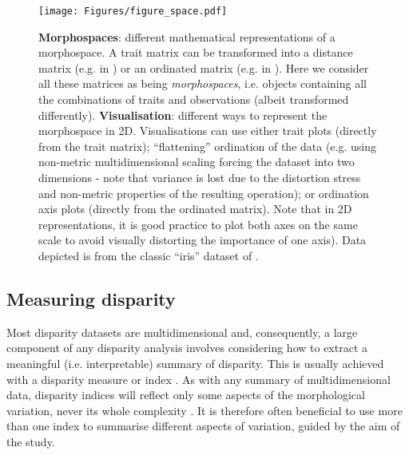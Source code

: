 \documentclass[12pt,letterpaper]{article}
\begin{document}
\begin{figure}[!htbp]
\centering
   \texttt{[image: Figures/figure\_space.pdf]}
\caption{
    \tiny{
    \textbf{Morphospaces}: different mathematical representations of a morphospace. A trait matrix can be transformed into a distance matrix (e.g. in \citealt{Close2015}) or an ordinated matrix (e.g. in \citealt{tyler2011detecting}).
    Here we consider all these matrices as being \textit{morphospaces}, i.e. objects containing all the combinations of traits and observations (albeit transformed differently).
    \textbf{Visualisation}: different  ways to represent the morphospace in 2D.
    Visualisations can use either trait plots (directly from the trait matrix); ``flattening'' ordination of the data (e.g. using non-metric multidimensional scaling forcing the dataset into two dimensions - note that variance is lost due to the distortion stress and non-metric properties of the resulting operation); or ordination axis plots (directly from the ordinated matrix).
    Note that in 2D representations, it is good practice to plot both axes on the same scale to avoid visually distorting the importance of one axis). Data depicted is from the classic ``iris'' dataset of \citep{edgar1935irises,fisher1936use}.
    }
}
\label{Fig:morphospace}
\end{figure}

\subsection{Measuring disparity} \label{section:metrics}

Most disparity datasets are multidimensional and, consequently, a large component of any disparity analysis involves considering how to extract a meaningful (i.e.
interpretable) summary of disparity.
This is usually achieved with a disparity measure or index \citep{Hopkins2017}.
As with any summary of multidimensional data, disparity indices will reflect only some aspects of the morphological variation, never its whole complexity \citep{GuillermeMOMS}.
It is therefore often beneficial to use more than one index to summarise different aspects of variation, guided by the aim of the study.
\end{document}
